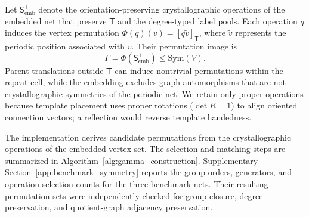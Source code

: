 \documentclass[a5paper, 10pt]{article}
\begin{document}
Let $\mathsf{S}_{\mathrm{emb}}^{+}$ denote the orientation-preserving crystallographic operations of the embedded net that preserve $\mathsf{T}$ and the degree-typed label pools. Each operation $q$ induces the vertex permutation $\Phi(q)(v)=[q\widetilde v]_{\mathsf T}$, where $\widetilde v$ represents the periodic position associated with $v$. Their permutation image is
\begin{equation}
\Gamma=\Phi(\mathsf{S}_{\mathrm{emb}}^{+})\leq\mathrm{Sym}(V).
\label{eq:rotation_group}
\end{equation}
Parent translations outside $\mathsf{T}$ can induce nontrivial permutations within the repeat cell, while the embedding excludes graph automorphisms that are not crystallographic symmetries of the periodic net.
We retain only proper operations because template placement uses proper rotations ($\det R=1$) to align oriented connection vectors; a reflection would reverse template handedness.

The implementation derives candidate permutations from the crystallographic operations of the embedded vertex set. The selection and matching steps are summarized in Algorithm~\ref{alg:gamma_construction}. Supplementary Section~\ref{app:benchmark_symmetry} reports the group orders, generators, and operation-selection counts for the three benchmark nets. Their resulting permutation sets were independently checked for group closure, degree preservation, and quotient-graph adjacency preservation.
\end{document}
